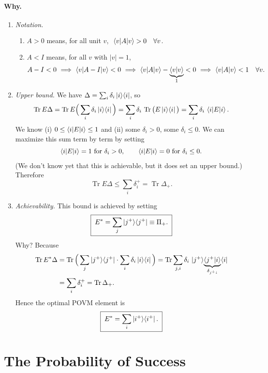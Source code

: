 \documentclass[11pt]{article}
\newcommand{\Tr}{\operatorname{Tr}}
\begin{document}
\paragraph{Why.}
\begin{enumerate}[label=\textbf{\arabic*.}, leftmargin=*]
\item \emph{Notation.}
\begin{enumerate}[label=(\roman*), nosep]
  \item $A>0$ means, for all unit $v$, $\ \braket{v|A|v}>0 \quad \forall v$.
  \item $A<I$ means, for all $v$ with $|v|=1$,
  \[
  A-I<0 \ \Longrightarrow\ \braket{v|A-I|v}<0
  \ \Longrightarrow\ \braket{v|A|v} - \underbrace{\braket{v|v}}_{1} < 0
  \ \Longrightarrow\ \braket{v|A|v}<1 \quad\forall v.
  \]
\end{enumerate}

\item \emph{Upper bound.}
We have $\Delta=\sum_i\delta_i\ket{i}\!\bra{i}$, so
\[
\Tr E\Delta
= \Tr E\Big(\sum_i\delta_i\ket{i}\!\bra{i}\Big)
= \sum_i \delta_i\,\Tr\big(E\ket{i}\!\bra{i}\big)
= \sum_i \delta_i\,\braket{i|E|i}.
\]
We know (i) $0\le\braket{i|E|i}\le 1$ and (ii) some $\delta_i>0$, some
$\delta_i\le 0$. We can maximize this sum term by term by setting
\[
\braket{i|E|i}=1 \ \text{for } \delta_i>0,
\qquad
\braket{i|E|i}=0 \ \text{for } \delta_i\le 0.
\]
(We don't know yet that this is achievable, but it does set an upper bound.)
Therefore
\[
\boxed{\; \Tr E\Delta \le \sum_i \delta_i^{+} = \Tr\Delta_{+}. \;}
\]

\item \emph{Achievability.}
This bound is achieved by setting
\[
\boxed{\; E^{*} = \sum_j \ket{j^{+}}\!\bra{j^{+}} \equiv \Pi_{+}. \;}
\]
Why? Because
\begin{align*}
\Tr E^{*}\Delta
&= \Tr\Big(\sum_j \ket{j^{+}}\!\bra{j^{+}}\cdot\sum_i\delta_i\ket{i}\!\bra{i}\Big)
= \Tr\sum_{j,i}\delta_i\,\ket{j^{+}}\!\underbrace{\braket{j^{+}|i}}_{\delta_{j^{+}i}}\!\bra{i}\\
&= \sum_i \delta_i^{+} = \Tr\Delta_{+}.
\end{align*}
Hence the optimal POVM element is
\[
\boxed{\; E^{*} = \sum_i \ket{i^{+}}\!\bra{i^{+}}. \;}
\]
\end{enumerate}

\section{The Probability of Success}
\end{document}
